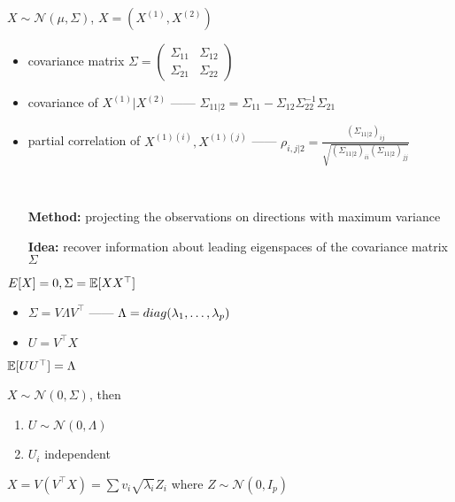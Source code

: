 \begin{setting}
    $X \sim \mathcal{N}(\mu, \Sigma)$, $X = (X^{(1)}, X^{(2)})$
\end{setting}

\begin{itemize}
    \item covariance matrix $\Sigma = \begin{pmatrix}
                                          \Sigma_{11} & \Sigma_{12} \\
                                          \Sigma_{21} & \Sigma_{22}
    \end{pmatrix}$
    \item covariance of $X^{(1)} | X^{(2)}$ ------ $\Sigma_{11|2} = \Sigma_{11} - \Sigma_{12}\Sigma_{22}^{-1}\Sigma_{21}$
    \item partial correlation of $X^{(1)(i)}, X^{(1)(j)}$ ------ $\rho_{i,j|2} = \frac{(\Sigma_{11|2})_{ij}}{\sqrt{(\Sigma_{11|2})_{ii} (\Sigma_{11|2})_{jj}}}$
\end{itemize}

\begin{example}[PCA]\,
    \begin{itemize}
        \item[\textbf{Method:}] projecting the observations on directions with maximum variance
        \item[\textbf{Idea:}] recover information about leading eigenspaces of the covariance matrix $\Sigma$
    \end{itemize}
    \begin{setting}
        $E[X] = 0, \Sigma = \mathbb{E}[XX^\top]$
    \end{setting}
    \begin{itemize}
        \item $\Sigma = V\Lambda V^\top$ ------ $\Lambda = diag(\ddd[p]{\lambda})$
        \item $U = V^\top X$
    \end{itemize}
    \begin{fact}
        $\mathbb{E}[UU^\top] = \Lambda$
    \end{fact}

    \begin{prop}
        $X \sim \mathcal{N}(0, \Sigma)$, then
        \begin{enumerate}
            \item $U \sim \mathcal{N}(0, \Lambda)$
            \item $U_i$ independent
        \end{enumerate}
    \end{prop}
    \begin{fact}
        $X = V(V^\top X) = \sum v_i \sqrt{\lambda_i} Z_i$ where $Z \sim \mathcal{N}(0, I_p)$
    \end{fact}
\end{example}

